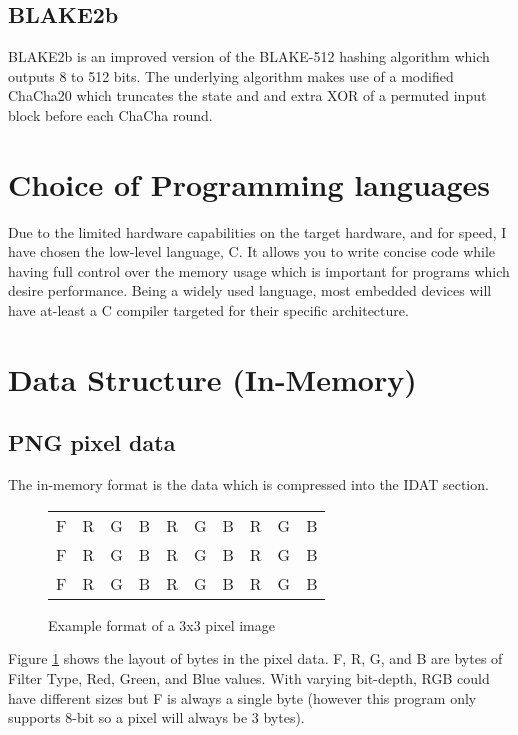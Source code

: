 \documentclass{report}
\begin{document}
\subsection{BLAKE2b}

BLAKE2b is an improved version of the BLAKE-512 hashing algorithm which outputs 8 to 512 bits. The underlying algorithm makes use of a modified ChaCha20 which truncates the state and and extra XOR of a permuted input block before each ChaCha round.

\section{Choice of Programming languages}

Due to the limited hardware capabilities on the target hardware, and for speed, I have chosen the low-level language, C. It allows you to write concise code while having full control over the memory usage which is important for programs which desire performance. Being a widely used language, most embedded devices will have at-least a C compiler targeted for their specific architecture.

\section{Data Structure (In-Memory)}

\subsection{PNG pixel data}

The in-memory format is the data which is compressed into the IDAT section. 

\begin{figure}[!htb]
\begin{center}
  \begin{tabular}{| c c c c c c c c c c |}
  \hline
   F & R & G & B & R & G & B & R & G & B \\
   F & R & G & B & R & G & B & R & G & B \\
   F & R & G & B & R & G & B & R & G & B \\
  \hline
  \end{tabular}
\end{center}
\caption{Example format of a 3x3 pixel image}
\label{table:png_dat}
\end{figure}
\noindent
Figure \ref{table:png_dat} shows the layout of bytes in the pixel data. F, R, G, and B are bytes of Filter Type, Red, Green, and Blue values. With varying bit-depth, RGB could have different sizes but F is always a single byte (however this program only supports 8-bit so a pixel will always be 3 bytes).
\end{document}
